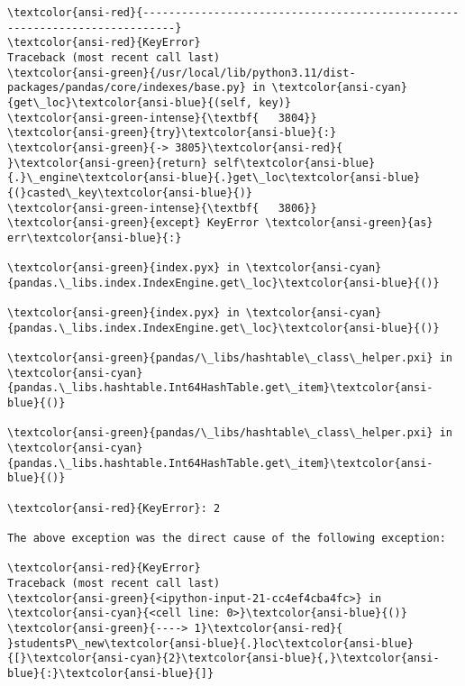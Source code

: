 \documentclass[11pt]{article}
\begin{document}
    \begin{Verbatim}[commandchars=\\\{\}, frame=single, framerule=2mm, rulecolor=\color{outerrorbackground}]
\textcolor{ansi-red}{---------------------------------------------------------------------------}
\textcolor{ansi-red}{KeyError}                                  Traceback (most recent call last)
\textcolor{ansi-green}{/usr/local/lib/python3.11/dist-packages/pandas/core/indexes/base.py} in \textcolor{ansi-cyan}{get\_loc}\textcolor{ansi-blue}{(self, key)}
\textcolor{ansi-green-intense}{\textbf{   3804}}         \textcolor{ansi-green}{try}\textcolor{ansi-blue}{:}
\textcolor{ansi-green}{-> 3805}\textcolor{ansi-red}{             }\textcolor{ansi-green}{return} self\textcolor{ansi-blue}{.}\_engine\textcolor{ansi-blue}{.}get\_loc\textcolor{ansi-blue}{(}casted\_key\textcolor{ansi-blue}{)}
\textcolor{ansi-green-intense}{\textbf{   3806}}         \textcolor{ansi-green}{except} KeyError \textcolor{ansi-green}{as} err\textcolor{ansi-blue}{:}

\textcolor{ansi-green}{index.pyx} in \textcolor{ansi-cyan}{pandas.\_libs.index.IndexEngine.get\_loc}\textcolor{ansi-blue}{()}

\textcolor{ansi-green}{index.pyx} in \textcolor{ansi-cyan}{pandas.\_libs.index.IndexEngine.get\_loc}\textcolor{ansi-blue}{()}

\textcolor{ansi-green}{pandas/\_libs/hashtable\_class\_helper.pxi} in \textcolor{ansi-cyan}{pandas.\_libs.hashtable.Int64HashTable.get\_item}\textcolor{ansi-blue}{()}

\textcolor{ansi-green}{pandas/\_libs/hashtable\_class\_helper.pxi} in \textcolor{ansi-cyan}{pandas.\_libs.hashtable.Int64HashTable.get\_item}\textcolor{ansi-blue}{()}

\textcolor{ansi-red}{KeyError}: 2

The above exception was the direct cause of the following exception:

\textcolor{ansi-red}{KeyError}                                  Traceback (most recent call last)
\textcolor{ansi-green}{<ipython-input-21-cc4ef4cba4fc>} in \textcolor{ansi-cyan}{<cell line: 0>}\textcolor{ansi-blue}{()}
\textcolor{ansi-green}{----> 1}\textcolor{ansi-red}{ }studentsP\_new\textcolor{ansi-blue}{.}loc\textcolor{ansi-blue}{[}\textcolor{ansi-cyan}{2}\textcolor{ansi-blue}{,}\textcolor{ansi-blue}{:}\textcolor{ansi-blue}{]}


\end{Verbatim}
\end{document}
